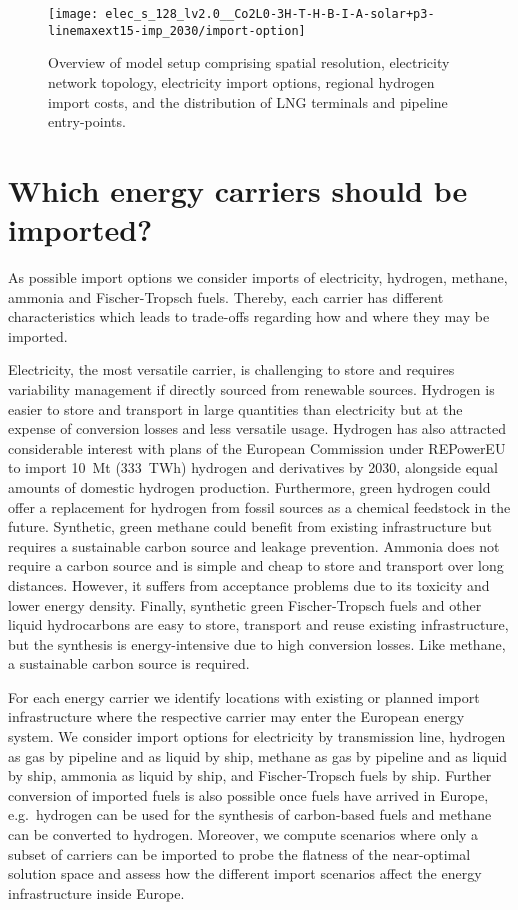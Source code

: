 \documentclass[10pt,5p,reversenotenum,lefttitle]{elsarticle}
\begin{document}
\begin{figure*}[ht]
    \centering
    \texttt{[image: elec\_s\_128\_lv2.0\_\_Co2L0-3H-T-H-B-I-A-solar+p3-linemaxext15-imp\_2030/import-option]}
    \caption{Overview of model setup comprising spatial resolution, electricity network topology, electricity import options, regional hydrogen import costs, and the distribution of LNG terminals and pipeline entry-points.}
    \label{fig:import-option}
\end{figure*}

\section*{Which energy carriers should be imported?}

As possible import options we consider imports of electricity, hydrogen,
methane, ammonia and Fischer-Tropsch fuels. Thereby, each carrier has different
characteristics which leads to trade-offs regarding how and where they may be
imported.

Electricity, the most versatile carrier, is challenging to store and requires
variability management if directly sourced from renewable sources. Hydrogen is
easier to store and transport in large quantities than electricity but at the
expense of conversion losses and less versatile usage. Hydrogen has also
attracted considerable interest with plans of the European Commission under
\mbox{REPowerEU}\cite{europeancommissionRepowerEUPlan} to import 10~Mt (333~TWh)
hydrogen and derivatives by 2030, alongside equal amounts of domestic hydrogen
production. Furthermore, green hydrogen could offer a replacement for hydrogen
from fossil sources as a chemical feedstock in the future. Synthetic, green
methane could benefit from existing infrastructure but requires a sustainable
carbon source and leakage prevention. Ammonia does not require a carbon source
and is simple and cheap to store and transport over long distances. However, it
suffers from acceptance problems due to its toxicity and lower energy density.
Finally, synthetic green Fischer-Tropsch fuels and other liquid hydrocarbons are
easy to store, transport and reuse existing infrastructure, but the synthesis is
energy-intensive due to high conversion losses. Like methane, a sustainable
carbon source is required.

For each energy carrier we identify locations with existing or planned import
infrastructure where the respective carrier may enter the European energy
system. We consider import options for electricity by transmission line,
hydrogen as gas by pipeline and as liquid by ship, methane as gas by pipeline
and as liquid by ship, ammonia as liquid by ship, and Fischer-Tropsch fuels by
ship. Further conversion of imported fuels is also possible once fuels have
arrived in Europe, e.g.~hydrogen can be used for the synthesis of carbon-based
fuels and methane can be converted to hydrogen. Moreover, we compute scenarios
where only a subset of carriers can be imported to probe the flatness of the
near-optimal solution space and assess how the different import scenarios affect
the energy infrastructure inside Europe.
\end{document}
